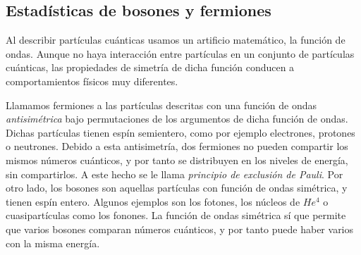 \documentclass[11pt, a4paper]{article} %
\theoremstyle{named}
\newcommand*\button[1]{
\tikz[baseline=(key.base)]
\node[%
draw,
fill=white,
drop shadow={shadow xshift=0.25ex,shadow yshift=-0.25ex,fill=black,opacity=0.75},
rectangle,
rounded corners=2pt,
inner sep=1pt,
line width=0.5pt,
font=\scriptsize\sffamily
](key) {#1\strut}
;
}
\begin{document}







\subsection{Estadísticas de bosones y fermiones}\label{sec:bosefermi}

Al describir partículas cuánticas usamos un artificio matemático, la función de ondas. Aunque no haya interacción entre partículas en un conjunto de partículas cuánticas, las propiedades de simetría de dicha función conducen a comportamientos físicos muy diferentes.

Llamamos fermiones a las partículas descritas con una función de ondas \textit{antisimétrica} bajo permutaciones de los argumentos de dicha función de ondas. Dichas partículas tienen espín semientero, como por ejemplo electrones, protones o neutrones. Debido a esta antisimetría, dos fermiones no pueden compartir los mismos números cuánticos, y por tanto se distribuyen en los niveles de energía, sin compartirlos. A este hecho se le llama \textit{principio de exclusión de Pauli}. Por otro lado, los bosones son aquellas partículas con función de ondas simétrica, y tienen espín entero. Algunos  ejemplos son los fotones, los núcleos de $He^4$ o cuasipartículas como los fonones. La función de ondas simétrica sí que permite que varios bosones comparan números cuánticos, y por tanto puede haber varios con la misma energía.
\end{document}
